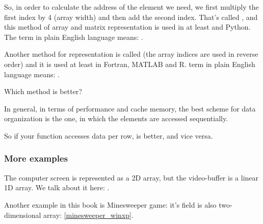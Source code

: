 
So, in order to calculate the address of the element we need, we first multiply the first index by
4 (array width) and then add the second index.
That's called , 
and this method of array and matrix representation is used in at least \CCpp and Python. 
The term  
in plain English language means: .

Another method for representation is called  (the array indices are used in reverse order) 
and it is used at least in Fortran, MATLAB and R. 
 term in plain English language means: .

Which method is better?

In general, in terms of performance and cache memory, 
the best scheme for data organization is the one,
in which the elements are accessed sequentially.

So if your function accesses data per row,  is better, and vice versa.





\subsubsection{More examples}

The computer screen is represented as a 2D array, but the video-buffer is a linear 1D array. 
We talk about it here: .

Another example in this book is Minesweeper game: it's field is also two-dimensional array: \ref{minesweeper_winxp}.

